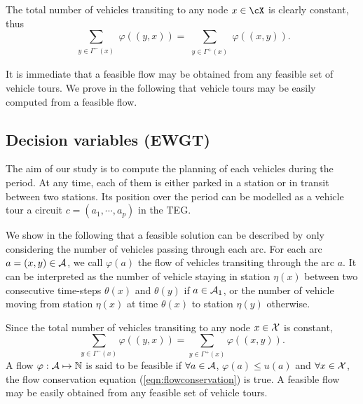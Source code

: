 \begin{bibunit}[ieeetr]
The total number of vehicles transiting to any node $x\in \cX$ is clearly constant, thus
$$\sum_{\substack{y\in \Gamma^-(x)}} \varphi((y,x))= \sum_{\substack{y\in \Gamma^+(x)}} \varphi((x,y)).$$


It is immediate that a feasible flow may be obtained from any feasible set of vehicle tours.
We prove in the following that vehicle tours may be easily computed from a feasible flow.

\subsection{Decision variables (EWGT)}
The aim of our study is to compute the planning of each vehicles during the period. 
At any time, each of them is either parked in a station or in transit between two stations. Its position over the period can be modelled as a vehicle tour \ie a circuit $c=(a_1,\cdots, a_p)$ in the TEG.

We show in the following that a feasible solution can be described by only considering the number of vehicles passing through each arc.
For each arc $a =(x,y) \in {\cal A}$, we call $\varphi(a)$ the flow of vehicles transiting through the arc $a$. 
It can be interpreted as the number of vehicle staying in station $\eta(x)$ between two consecutive time-steps $\theta(x)$ and $\theta(y)$ if $a \in {\cal A}_1$, or 
the number of vehicle moving from station $\eta(x)$ at time $\theta(x)$ to station $\eta(y)$ otherwise.

Since the total number of vehicles transiting to any node $x \in {\cal X}$ is constant, 
\begin{equation}\label{eqn:flowconservation}
\sum_{{y\in \Gamma^-(x)}} \varphi((y,x))= \sum_{{y\in \Gamma^+(x)}} \varphi((x,y)).
\end{equation}
A flow $\varphi:{\cal A}\mapsto\mathbb{N}$  is said to be feasible if $\forall a\in {\cal A}$, $\varphi(a)\leq u(a)$ and 
$\forall x \in {\cal X}$, the flow conservation equation (\ref{eqn:flowconservation}) is true.
A feasible flow may be easily obtained from any feasible set of vehicle tours.


\end{bibunit}

